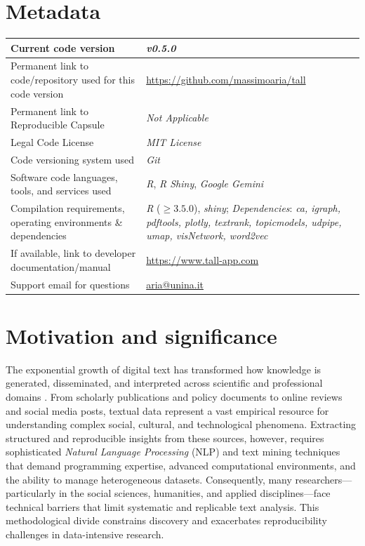 \documentclass[preprint,12pt,a4paper]{elsarticle}
\begin{document}

\section*{Metadata}

\begin{table}[!ht]
\begin{tabular}{|p{6.5cm}|p{6.5cm}|}
\hline
Current code version & \textit{v0.5.0} \\
\hline
Permanent link to code/repository used for this code version & \url{https://github.com/massimoaria/tall} \\
\hline
Permanent link to Reproducible Capsule & \textit{Not Applicable}\\
\hline
Legal Code License & \textit{MIT License} \\
\hline
Code versioning system used & \textit{Git} \\
\hline
Software code languages, tools, and services used & \textit{R}, \textit{R Shiny}, \textit{Google Gemini} \\
\hline
Compilation requirements, operating environments \& dependencies & 
\textit{R} ($\mathit{\geq 3.5.0}$), \textit{shiny}; \textit{Dependencies}: \textit{ca, igraph, pdftools, plotly, textrank, topicmodels, udpipe, umap, visNetwork, word2vec} \\
\hline
If available, link to developer documentation/manual & \url{https://www.tall-app.com} \\
\hline
Support email for questions & \href{mailto:aria@unina.it}{aria@unina.it} \\
\hline
\end{tabular}
\label{codeMetadata} 
\end{table}

\section{Motivation and significance}
The exponential growth of digital text has transformed how knowledge is generated, disseminated, and interpreted across scientific and professional domains \cite{ign16}. From scholarly publications and policy documents to online reviews and social media posts, textual data represent a vast empirical resource for understanding complex social, cultural, and technological phenomena. Extracting structured and reproducible insights from these sources, however, requires sophisticated \textit{Natural Language Processing} (NLP) and text mining techniques that demand programming expertise, advanced computational environments, and the ability to manage heterogeneous datasets. Consequently, many researchers—particularly in the social sciences, humanities, and applied disciplines—face technical barriers that limit systematic and replicable text analysis. This methodological divide constrains discovery and exacerbates reproducibility challenges in data-intensive research.
\end{document}
